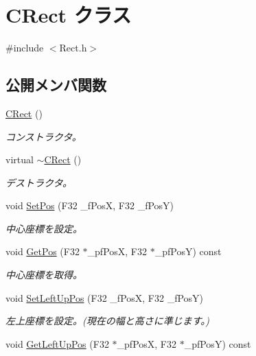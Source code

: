 \hypertarget{class_c_rect}{}\section{C\+Rect クラス}
\label{class_c_rect}


{\ttfamily \#include $<$Rect.\+h$>$}

\subsection*{公開メンバ関数}
\begin{DoxyCompactItemize}
\item 
\hyperlink{class_c_rect_a9e8ba088900203ee8a73bb07c941db85}{C\+Rect} ()
\begin{DoxyCompactList}\small\item\em コンストラクタ。 \end{DoxyCompactList}\item 
virtual \hyperlink{class_c_rect_a8c39e88d9bb599e29523326890f13119}{$\sim$\+C\+Rect} ()
\begin{DoxyCompactList}\small\item\em デストラクタ。 \end{DoxyCompactList}\item 
void \hyperlink{class_c_rect_a1d9f0a04deaac9560e728472cbd278c1}{Set\+Pos} (F32 \+\_\+f\+Pos\+X, F32 \+\_\+f\+Pos\+Y)
\begin{DoxyCompactList}\small\item\em 中心座標を設定。 \end{DoxyCompactList}\item 
void \hyperlink{class_c_rect_ad5dbe9a3a6f2516e587b19d4c468bf2e}{Get\+Pos} (F32 $\ast$\+\_\+pf\+Pos\+X, F32 $\ast$\+\_\+pf\+Pos\+Y) const 
\begin{DoxyCompactList}\small\item\em 中心座標を取得。 \end{DoxyCompactList}\item 
void \hyperlink{class_c_rect_afafef92a566874ce29a31a7e28e9ae4b}{Set\+Left\+Up\+Pos} (F32 \+\_\+f\+Pos\+X, F32 \+\_\+f\+Pos\+Y)
\begin{DoxyCompactList}\small\item\em 左上座標を設定。(現在の幅と高さに準じます。) \end{DoxyCompactList}\item 
void \hyperlink{class_c_rect_a19c904cb98ed5b357a76bcfb2f6bbf2e}{Get\+Left\+Up\+Pos} (F32 $\ast$\+\_\+pf\+Pos\+X, F32 $\ast$\+\_\+pf\+Pos\+Y) const 

\end{DoxyCompactItemize}
